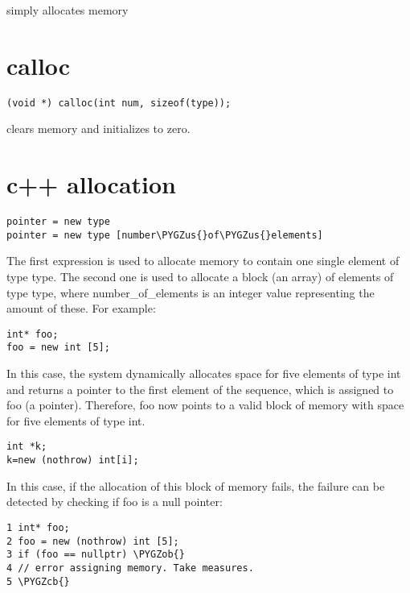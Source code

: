 \documentclass[letterpaper,10pt,english]{sphinxmanual}
\def\PYGZus{\char`\_}
\def\PYGZob{\char`\{}
\def\PYGZcb{\char`\}}
\begin{document}
simply allocates memory


\section{calloc}
\label{allocation:calloc}
\begin{Verbatim}[commandchars=\\\{\}]
(void *) calloc(int num, sizeof(type));
\end{Verbatim}

clears memory and initializes to zero.


\section{c++ allocation}
\label{allocation:c-allocation}
\begin{Verbatim}[commandchars=\\\{\}]
pointer = new type
pointer = new type [number\PYGZus{}of\PYGZus{}elements]
\end{Verbatim}

The first expression is used to allocate memory to contain one single element of type type. The second one is used to allocate a block (an array) of elements of type type, where number\_of\_elements is an integer value representing the amount of these. For example:

\begin{Verbatim}[commandchars=\\\{\}]
int* foo;
foo = new int [5];
\end{Verbatim}

In this case, the system dynamically allocates space for five elements of type int and returns a pointer to the first element of the sequence, which is assigned to foo (a pointer). Therefore, foo now points to a valid block of memory with space for five elements of type int.

\begin{Verbatim}[commandchars=\\\{\}]
int *k;
k=new (nothrow) int[i];
\end{Verbatim}

In this case, if the allocation of this block of memory fails, the failure can be detected by checking if foo is a null pointer:

\begin{Verbatim}[commandchars=\\\{\}]
1 int* foo;
2 foo = new (nothrow) int [5];
3 if (foo == nullptr) \PYGZob{}
4 // error assigning memory. Take measures.
5 \PYGZcb{}
\end{Verbatim}
\end{document}
